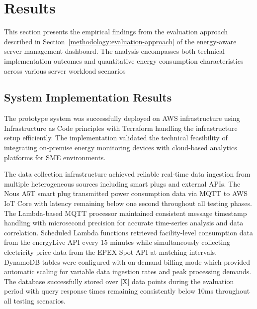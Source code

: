 

\section{Results}
\label{results:results}
This section presents the empirical findings from the evaluation approach described in Section~\ref{methodology:evaluation-approach} of the energy-aware server management dashboard. 
The analysis encompasses both technical implementation outcomes and quantitative energy consumption characteristics across various server workload scenarios

\subsection{System Implementation Results}
\label{results:system-implementation-results}
The prototype system was successfully deployed on AWS infrastructure using Infrastructure as Code principles with Terraform handling the infrastructure setup efficiently. The implementation validated the technical feasibility of integrating on-premise energy monitoring devices with cloud-based analytics platforms for SME environments.

The data collection infrastructure achieved reliable real-time data ingestion from multiple heterogeneous sources including smart plugs and external APIs. The Nous A5T smart plug transmitted power consumption data via MQTT to AWS IoT Core with latency remaining below one second throughout all testing phases. The Lambda-based MQTT processor maintained consistent message timestamp handling with microsecond precision for accurate time-series analysis and data correlation. Scheduled Lambda functions retrieved facility-level consumption data from the energyLive API every 15 minutes while simultaneously collecting electricity price data from the EPEX Spot API at matching intervals. DynamoDB tables were configured with on-demand billing mode which provided automatic scaling for variable data ingestion rates and peak processing demands. The database successfully stored over [X] data points during the evaluation period with query response times remaining consistently below 10ms throughout all testing scenarios.


